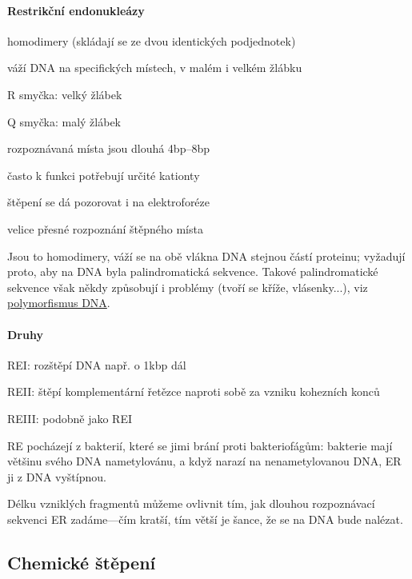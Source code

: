 \documentclass[DIV=8]{scrreprt}
\newcommand{\mybox}[2]{
    \paragraph{#1} #2
}
\begin{document}
\mybox{Restrikční endonukleázy}{\begin{myItemize}[nosep]
    \item homodimery (skládají se ze dvou identických podjednotek)
    \item váží DNA na specifických místech, v malém i velkém žlábku
\begin{myItemize}[nosep]
    \item R smyčka: velký žlábek
    \item Q smyčka: malý žlábek
\end{myItemize}

    \item rozpoznávaná místa jsou dlouhá 4bp--8bp
    \item často k funkci potřebují určité kationty
    \item štěpení se dá pozorovat i na elektroforéze
    \item velice přesné rozpoznání štěpného místa
\end{myItemize}



Jsou to homodimery, váží se na obě vlákna DNA stejnou částí proteinu; vyžadují proto, aby na DNA byla palindromatická sekvence. Takové palindromatické sekvence však někdy způsobují i problémy (tvoří se kříže, vlásenky...), viz \hyperref[Další konformační anomálie]{polymorfismus DNA}.

\paragraph{Druhy}
\begin{myItemize}[nosep]
    \item REI: rozštěpí DNA např. o 1kbp dál
    \item REII: štěpí komplementární řetězce naproti sobě za vzniku kohezních konců
    \item REIII: podobně jako REI
\end{myItemize}



RE pocházejí z bakterií, které se jimi brání proti bakteriofágům: bakterie mají většinu svého DNA nametylovánu, a když narazí na nenametylovanou DNA, ER ji z DNA vyštípnou.

Délku vzniklých fragmentů můžeme ovlivnit tím, jak dlouhou rozpoznávací sekvenci ER zadáme---čím kratší, tím větší je šance, že se na DNA bude nalézat.}


\subsection{Chemické štěpení} \label{Chemické štěpení}
\end{document}
